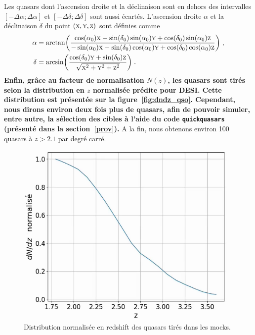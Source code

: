\documentclass[11pt, twoside, a4paper, openright]{report}
\begin{document}
Les quasars dont l'ascension droite et la déclinaison sont en dehors des intervalles $[ - \Delta \alpha ; \Delta \alpha]$ et $[ - \Delta \delta ; \Delta \delta]$ sont aussi écartés.
L'ascension droite $\alpha$ et la déclinaison $\delta$ du point $(\textsc{x},\textsc{y},\textsc{z})$ sont définies comme
\begin{align}
  \label{eq:radec}
  \alpha &= \arctan(\frac{
  \cos(\alpha_0)\textsc{x} - \sin(\delta_0)\sin(\alpha_0)\textsc{y} + \cos(\delta_0)\sin(\alpha_0)\textsc{z}
  }{
  - \sin(\alpha_0)\textsc{x} - \sin(\delta_0)\cos(\alpha_0)\textsc{y} + \cos(\delta_0)\cos(\alpha_0)\textsc{z}
           }) \; ,\\
  \delta &= \arcsin(\frac{
           \cos(\delta_0)\textsc{y} + \sin(\delta_0) \textsc{z}
           }{
           \sqrt{\textsc{x}^2 + \textsc{y}^2 + \textsc{z}^2}
           }) \; .
\end{align}
\textbf{Enfin, grâce au facteur de normalisation $N(z)$, les quasars sont tirés selon la distribution en $z$ normalisée prédite pour DESI. Cette distribution est présentée sur la figure~\ref{fig:dndz_qso}. Cependant, nous dirons environ deux fois plus de quasars, afin de pouvoir simuler, entre autre, la sélection des cibles à l'aide du code \texttt{quickquasars} (présenté dans la section~\ref{prov}).}
A la fin, nous obtenons environ \num{100} quasars à $z > \num{2.1}$ par degré carré.
\begin{figure}
  \centering
  \includegraphics[scale=0.5]{dndz_qso}
  \caption{Distribution normalisée en redshift des quasars tirés dans les mocks.}
\end{figure}
\end{document}
